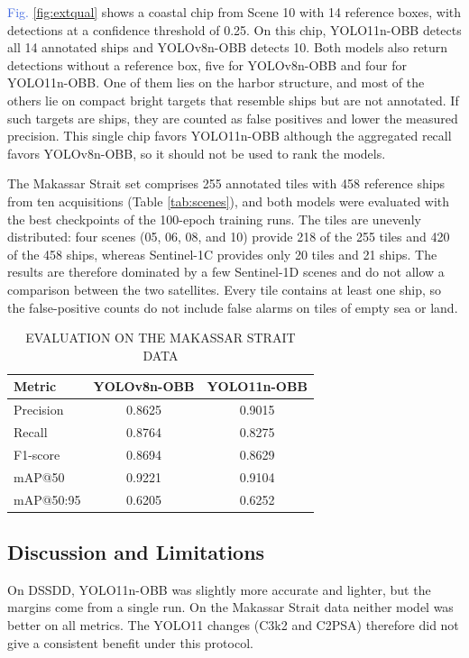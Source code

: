 \documentclass[conference]{IEEEtran}
\begin{document}
\textcolor{RoyalBlue}{Fig.} \ref{fig:extqual} shows a coastal chip from Scene 10 with 14 reference boxes, with detections at a confidence threshold of 0.25. On this chip, YOLO11n-OBB detects all 14 annotated ships and YOLOv8n-OBB detects 10. Both models also return detections without a reference box, five for YOLOv8n-OBB and four for YOLO11n-OBB. One of them lies on the harbor structure, and most of the others lie on compact bright targets that resemble ships but are not annotated. If such targets are ships, they are counted as false positives and lower the measured precision. This single chip favors YOLO11n-OBB although the aggregated recall favors YOLOv8n-OBB, so it should not be used to rank the models.

The Makassar Strait set comprises 255 annotated tiles with 458 reference ships from ten acquisitions (Table \ref{tab:scenes}), and both models were evaluated with the best checkpoints of the 100-epoch training runs. The tiles are unevenly distributed: four scenes (05, 06, 08, and 10) provide 218 of the 255 tiles and 420 of the 458 ships, whereas Sentinel-1C provides only 20 tiles and 21 ships. The results are therefore dominated by a few Sentinel-1D scenes and do not allow a comparison between the two satellites. Every tile contains at least one ship, so the false-positive counts do not include false alarms on tiles of empty sea or land.

\begin{table}[h!]
	\centering
	\caption{EVALUATION ON THE MAKASSAR STRAIT DATA}
	\begin{footnotesize}
	\begin{tabular}{lcc}
		\hline
		\textbf{Metric} & \textbf{YOLOv8n-OBB} & \textbf{YOLO11n-OBB} \\
		\hline
		Precision & 0.8625 & 0.9015 \\
		Recall & 0.8764 & 0.8275 \\
		F1-score & 0.8694 & 0.8629 \\
		mAP@50 & 0.9221 & 0.9104 \\
		mAP@50:95 & 0.6205 & 0.6252 \\
		\hline
	\end{tabular}
	\label{tab:external}
	\end{footnotesize}
\end{table}

\subsection{Discussion and Limitations}
On DSSDD, YOLO11n-OBB was slightly more accurate and lighter, but the margins come from a single run. On the Makassar Strait data neither model was better on all metrics. The YOLO11 changes (C3k2 and C2PSA) therefore did not give a consistent benefit under this protocol.
\end{document}
